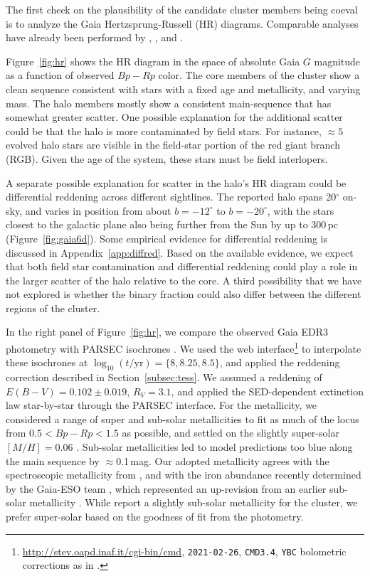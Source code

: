 \documentclass[12pt,twocolumn,tighten]{aastex63}
\begin{document}
The first check on the plausibility of the candidate cluster members
being coeval is to analyze the Gaia Hertzsprung-Russell (HR) diagrams.  Comparable analyses
have already been performed by ,
, and .

Figure~\ref{fig:hr} shows the HR diagram in the space of absolute Gaia
$G$ magnitude as a function of observed $Bp-Rp$ color.  The core
members of the cluster show a clean sequence consistent with stars
with a fixed age and metallicity, and varying mass.  The halo members
mostly show a consistent main-sequence that has somewhat greater
scatter.  One possible explanation for the additional scatter could be
that the halo is more contaminated by field stars.  For instance,
$\approx5$ evolved halo stars are visible in the field-star portion of
the red giant branch (RGB).  Given the age of the system, these stars
must be field interlopers.

A separate possible explanation for scatter in the halo's HR diagram
could be differential reddening across different sightlines.  The
reported halo spans 20$^\circ$ on-sky, and varies in position from
about $b=-12^\circ$ to $b=-20^\circ$, with the stars closest to the
galactic plane also being further from the Sun by up to 300\,pc
(Figure~\ref{fig:gaia6d}).  Some empirical evidence for differential
reddening is discussed in Appendix~\ref{app:diffred}. Based on the
available evidence, we expect that both field star contamination and
differential reddening could play a role in the larger scatter of the
halo relative to the core.  A third possibility that we have not
explored is whether the binary fraction could also differ between the
different regions of the cluster.

In the right panel of Figure~\ref{fig:hr}, we compare the observed
Gaia EDR3 photometry with PARSEC isochrones
\citep{bressan_parsec_2012,chen_improving_2014,chen_parsec_2015,marigo_new_2017}.
We used the web
interface\footnote{\url{http://stev.oapd.inaf.it/cgi-bin/cmd},
\texttt{2021-02-26}, \texttt{CMD3.4}, \texttt{YBC} bolometric
corrections as in \citet{chen_2019_YBC}.} to interpolate these
isochrones at $\log_{10}(t/\mathrm{yr})=\{8, 8.25, 8.5\}$, and applied
the reddening correction described in Section~\ref{subsec:tess}.  We
assumed a reddening of $E(B-V)=0.102\pm0.019$, $R_V=3.1$, and applied
the \citet{odonnell_1994} SED-dependent extinction law star-by-star
through the PARSEC interface.  For the metallicity, we considered a
range of super and sub-solar metallicities to fit as much of the locus
from $0.5<Bp-Rp<1.5$ as possible, and settled on the slightly
super-solar $[M/H]=0.06$ \citep{cummings_2011_li_iron}.  Sub-solar
metallicities led to model predictions too blue along the main
sequence by $\approx$0.1\,mag.  Our adopted metallicity agrees with
the spectroscopic metallicity from
\citet[][Sec~4.4.4]{cummings_2011_li_iron}, and with the iron
abundance recently determined by the Gaia-ESO team
\citep{baratella_gaiaeso_2020}, which represented an up-revision from
an earlier sub-solar metallicity \citep{randich_gaiaeso_2018}.  While
\citet{bailey_rv_2018} report a slightly sub-solar metallicity for the
cluster, we prefer super-solar based on the goodness of fit from the
photometry.
\end{document}
